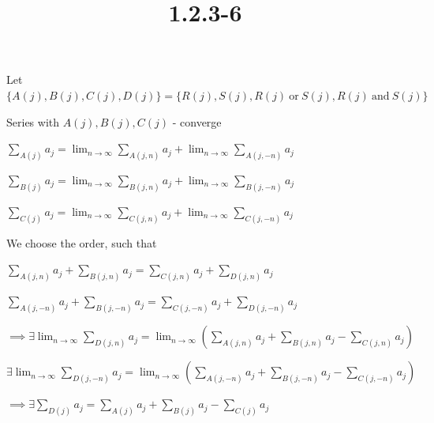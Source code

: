 \documentclass{article}
\title{1.2.3-6}
\begin{document}
\maketitle

Let $\{ A(j), B(j), C(j), D(j) \} = \{ R(j), S(j), R(j)\ \textrm{or}\ S(j), R(j)\ \textrm{and}\ S(j) \}$

Series with $A(j), B(j), C(j)$ - converge

$\sum_{A(j)} a_j = \lim_{n\to\infty} \sum_{A(j,n)} a_j + \lim_{n\to\infty} \sum_{A(j,-n)} a_j$

$\sum_{B(j)} a_j = \lim_{n\to\infty} \sum_{B(j,n)} a_j + \lim_{n\to\infty} \sum_{B(j,-n)} a_j$

$\sum_{C(j)} a_j = \lim_{n\to\infty} \sum_{C(j,n)} a_j + \lim_{n\to\infty} \sum_{C(j,-n)} a_j$

We choose the order, such that

$\sum_{A(j,n)} a_j + \sum_{B(j,n)} a_j = \sum_{C(j,n)} a_j + \sum_{D(j,n)} a_j$

$\sum_{A(j,-n)} a_j + \sum_{B(j,-n)} a_j = \sum_{C(j,-n)} a_j + \sum_{D(j,-n)} a_j$

$\implies \exists \lim_{n\to\infty} \sum_{D(j,n)} a_j = \lim_{n\to\infty}(\sum_{A(j,n)} a_j + \sum_{B(j,n)} a_j - \sum_{C(j,n)} a_j)$

$\exists \lim_{n\to\infty} \sum_{D(j,-n)} a_j = \lim_{n\to\infty}(\sum_{A(j,-n)} a_j + \sum_{B(j,-n)} a_j - \sum_{C(j,-n)} a_j)$

$\implies \exists \sum_{D(j)} a_j = \sum_{A(j)} a_j + \sum_{B(j)} a_j - \sum_{C(j)} a_j$
\end{document}
